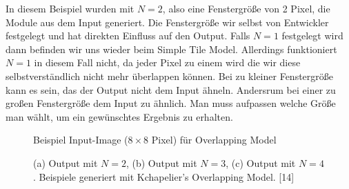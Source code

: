 \documentclass[12pt, a4paper,twoside,openright]{report}
\begin{document}
In diesem Beispiel wurden mit $N = 2$, also eine Fenstergröße von 2 Pixel, die Module aus dem Input generiert.
Die Fenstergröße wir selbst von Entwickler festgelegt und hat direkten Einfluss auf den Output.
Falls $N = 1$ festgelegt wird dann befinden wir uns wieder beim Simple Tile Model.
Allerdings funktioniert $N = 1$ in diesem Fall nicht, da jeder Pixel zu einem  wird die wir diese selbstverständlich nicht mehr überlappen können.
Bei zu kleiner Fenstergröße kann es sein, das der Output nicht dem Input ähneln.
Andersrum bei einer zu großen Fenstergröße dem Input zu ähnlich.
Man muss aufpassen welche Größe man wählt, um ein gewünschtes Ergebnis zu erhalten.

\begin{figure}[H]
    \centering
    \caption{Beispiel Input-Image ($8\times8$ Pixel) für Overlapping Model}%
\end{figure}

\begin{figure}[H]
    \centering
    \qquad
    \qquad
    \caption{(a) Output mit $N = 2$, (b) Output mit $N = 3$, (c) Output mit $N = 4$. Beispiele generiert mit Kchapelier's Overlapping Model. [14]}%
\end{figure}
\end{document}

